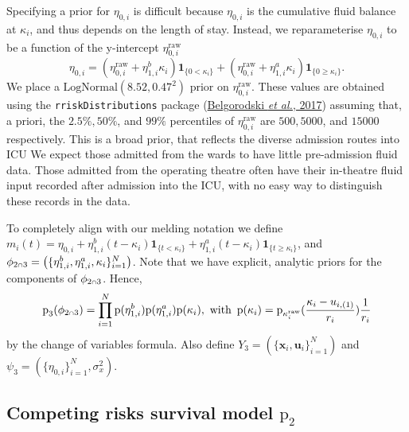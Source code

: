 \documentclass[
  10pt,
  a4paper,
]{article}
\let\Oldcap\cap
\renewcommand{\cap}{\mathrel{\mathsmaller{\Oldcap}}}
\newcommand{\pd}{\text{p}}
\begin{document}
Specifying a prior for \(\eta_{0, i}\) is difficult because
\(\eta_{0, i}\) is the cumulative fluid balance at \(\kappa_{i}\), and
thus depends on the length of stay. Instead, we reparameterise
\(\eta_{0, i}\) to be a function of the y-intercept
\(\eta_{0, i}^{\text{raw}}\) \begin{equation}
  \eta_{0, i} =
    (\eta_{0, i}^{\text{raw}} + \eta^{b}_{1, i} \kappa_{i}) \boldsymbol{1}_{\{0 < \kappa_{i}\}} +
    (\eta_{0, i}^{\text{raw}} + \eta^{a}_{1, i} \kappa_{i}) \boldsymbol{1}_{\{0 \geq \kappa_{i}\}}.
\end{equation} We place a \(\text{LogNormal}(8.52, 0.47^2)\) prior on
\(\eta_{0, i}^{\text{raw}}\). These values are obtained using the
\texttt{rriskDistributions} package
(\protect\hyperlink{ref-belgorodski_rriskdistributions_2017}{Belgorodski
\emph{et al.}, 2017}) assuming that, a priori, the \(2.5\%, 50\%\), and
\(99\%\) percentiles of \(\eta_{0, i}^{\text{raw}}\) are \(500, 5000\),
and \(15000\) respectively. This is a broad prior, that reflects the
diverse admission routes into ICU We expect those admitted from the
wards to have little pre-admission fluid data. Those admitted from the
operating theatre often have their in-theatre fluid input recorded after
admission into the ICU, with no easy way to distinguish these records in
the data.

To completely align with our melding notation we define
\(m_{i}(t) = \eta_{0, i} + \eta^{b}_{1, i}(t - \kappa_{i})\boldsymbol{1}_{\{t < \kappa_{i}\}} + \eta^{a}_{1, i}(t - \kappa_{i})\boldsymbol{1}_{\{t \geq \kappa_{i}\}}\),
and
\(\phi_{2 \cap 3} = \left(\{\eta^{b}_{1, i}, \eta^{a}_{1, i}, \kappa_{i}\}_{i = 1}^{N}\right)\).
Note that we have explicit, analytic priors for the components of
\(\phi_{2 \cap 3}\). Hence, \begin{equation}
  \pd_{3}(\phi_{2 \cap 3}) = \prod_{i = 1}^{N} \pd(\eta^{b}_{1, i}) \pd(\eta^{a}_{1, i}) \pd(\kappa_{i}), \,\, \text{with} \,\,\,
  \pd(\kappa_{i}) = \pd_{\kappa^{\text{raw}}_{i}}(\frac{\kappa_{i} - u_{i, (1)}}{r_{i}}) \frac{1}{r_{i}}
\end{equation} by the change of variables formula. Also define
\(Y_{3} = (\{\boldsymbol{x}_{i}, \boldsymbol{u}_{i}\}_{i = 1}^{N})\) and
\(\psi_{3} = (\{\eta_{0, i}\}_{i = 1}^{N}, \sigma^{2}_{x})\).

\hypertarget{competing-risks-survival-model-pd_2}{%
\subsection{\texorpdfstring{Competing risks survival model
\(\pd_{2}\)}{Competing risks survival model \textbackslash pd\_\{2\}}}\label{competing-risks-survival-model-pd_2}}
\end{document}

